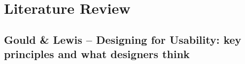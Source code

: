 \documentclass[11pt,a4paper]{report}
\begin{document}

\clearpage\maketitle
\thispagestyle{empty}

\newpage
\tableofcontents{}
\thispagestyle{empty}


\newpage

\chapter{Literature Review}\label{ch:Literature_Review}

\section{Gould \& Lewis -- Designing for Usability: key principles and what
designers think}
\end{document}
